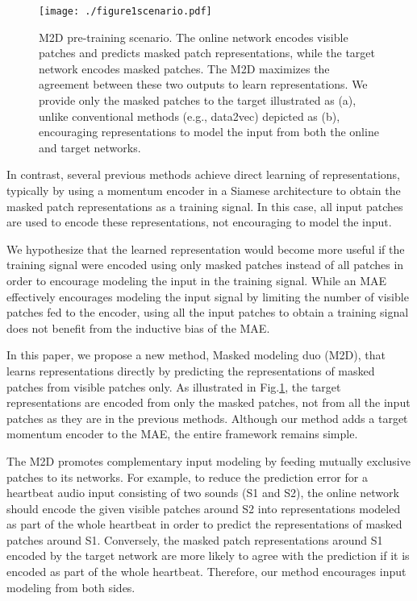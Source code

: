 \documentclass{article}
\begin{document}
\begin{figure}[htbp]
  \centering
  \texttt{[image: ./figure1scenario.pdf]} 
  \vspace{-15pt}
  \caption{
M2D pre-training scenario. The online network encodes visible patches and predicts masked patch representations, while the target network encodes masked patches. The M2D maximizes the agreement between these two outputs to learn representations. We provide only the masked patches to the target illustrated as (a), unlike conventional methods (e.g., data2vec\cite{baevski2022data2vec}) depicted as (b), encouraging representations to model the input from both the online and target networks.
  }
  \label{fig:scenario}
  \vspace{-10pt}
\end{figure}

In contrast, several previous methods\cite{tao2022MIM:SIM,assran2022MIM:MSN,baevski2022data2vec} achieve direct learning of representations, typically by using a momentum encoder in a Siamese architecture\cite{Xinlei2021SimSham} to obtain the masked patch representations as a training signal. In this case, all input patches are used to encode these representations, not encouraging to model the input.

We hypothesize that the learned representation would become more useful if the training signal were encoded using only masked patches instead of all patches in order to encourage modeling the input in the training signal.
While an MAE effectively encourages modeling the input signal by limiting the number of visible patches fed to the encoder, using all the input patches to obtain a training signal does not benefit from the inductive bias of the MAE.

In this paper, we propose a new method, Masked modeling duo (M2D), that learns representations directly by predicting the representations of masked patches from visible patches only.
As illustrated in Fig.\ref{fig:scenario},
the target representations are encoded from only the masked patches, not from all the input patches as they are in the previous methods\cite{tao2022MIM:SIM,assran2022MIM:MSN,baevski2022data2vec}.
Although our method adds a target momentum encoder to the MAE, the entire framework remains simple.

The M2D promotes complementary input modeling by feeding mutually exclusive patches to its networks.
For example, to reduce the prediction error for a heartbeat audio input consisting of two sounds (S1 and S2), the online network should encode the given visible patches around S2 into representations modeled as part of the whole heartbeat in order to predict the representations of masked patches around S1. Conversely, the masked patch representations around S1 encoded by the target network are more likely to agree with the prediction if it is encoded as part of the whole heartbeat. Therefore, our method encourages input modeling from both sides.
\end{document}
